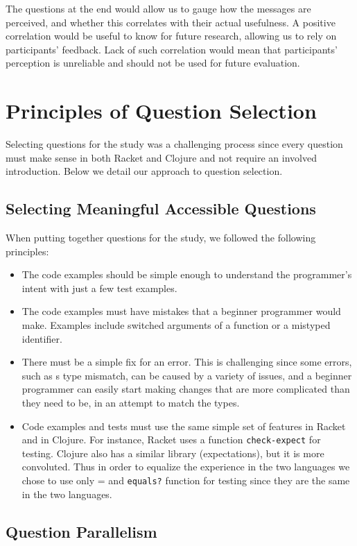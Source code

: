 \documentclass[submission,copyright,creativecommons]{eptcs}
\begin{document}
The questions at the end would allow us to gauge how the messages are perceived, and whether this correlates with their actual usefulness. A positive correlation would be useful to know for future research, allowing us to rely on participants' feedback. 
Lack of such correlation would mean that participants' perception is unreliable and should not be used for future evaluation.  

\section{Principles of Question Selection}\label{sec:select}
	Selecting questions for the study was a challenging process since every question must make sense in both Racket and Clojure and not require an involved introduction. Below we detail our approach to question selection.

	\subsection{Selecting Meaningful Accessible Questions}\label{sec:meaning}
	When putting together questions for the study, we followed the following principles:
	\begin{itemize}
	\item The code examples should be simple enough to understand the programmer's intent with just a few test examples. 
	\item The code examples must have mistakes that a beginner programmer would make. Examples include switched arguments of a function or a mistyped identifier. 
	\item There must be a simple fix for an error. This is challenging since some errors, such as s type mismatch, can be caused by a variety of issues, and a beginner
	programmer can easily start making changes that are more complicated than they need to be, in an attempt to match the types. 
	\item Code examples and tests must use the same simple set of features in Racket and in Clojure. For instance, Racket uses a function \texttt{check-expect} for testing. Clojure also has a similar library (expectations), but it is more convoluted. Thus in order to equalize the experience in the two languages we chose to use only = and \texttt{equals?} function for testing since they are the same in the two languages. 
	\end{itemize}


	\subsection{Question Parallelism}\label{sec:parallel}
	
\end{document}
